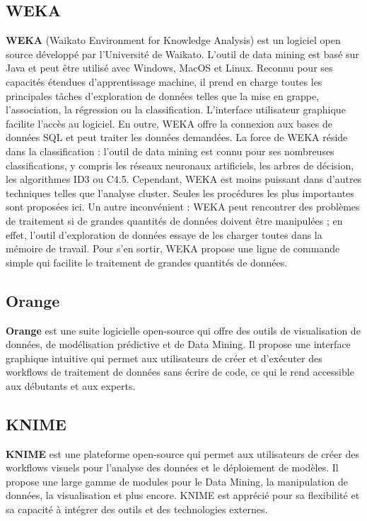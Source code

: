 \documentclass[a4paper,12pt]{report}
\begin{document}
    
    \subsection{WEKA}
    \textbf{WEKA} (Waikato Environment for Knowledge Analysis) est un logiciel open source développé par l'Université de Waikato. L'outil de data mining est basé sur Java et peut être utilisé avec Windows, MacOS et Linux. Reconnu pour ses capacités étendues d'apprentissage machine, il prend en charge toutes les principales tâches d'exploration de données telles que la mise en grappe, l'association, la régression ou la classification. L'interface utilisateur graphique facilite l'accès au logiciel. En outre, WEKA offre la connexion aux bases de données SQL et peut traiter les données demandées. La force de WEKA réside dans la classification : l'outil de data mining est connu pour ses nombreuses classifications, y compris les réseaux neuronaux artificiels, les arbres de décision, les algorithmes ID3 ou C4.5. Cependant, WEKA est moins puissant dans d'autres techniques telles que l'analyse cluster. Seules les procédures les plus importantes sont proposées ici. Un autre inconvénient : WEKA peut rencontrer des problèmes de traitement si de grandes quantités de données doivent être manipulées ; en effet, l'outil d'exploration de données essaye de les charger toutes dans la mémoire de travail. Pour s'en sortir, WEKA propose une ligne de commande simple qui facilite le traitement de grandes quantités de données. 

    
    \subsection{Orange}
    \textbf{Orange} est une suite logicielle open-source qui offre des outils de visualisation de données, de modélisation prédictive et de Data Mining. Il propose une interface graphique intuitive qui permet aux utilisateurs de créer et d’exécuter des workflows de traitement de données sans écrire de code, ce qui le rend accessible aux débutants et aux experts.

    
    \subsection{KNIME}
    \textbf{KNIME} est une plateforme open-source qui permet aux utilisateurs de créer des workflows visuels pour l’analyse des données et le déploiement de modèles. Il propose une large gamme de modules pour le Data Mining, la manipulation de données, la visualisation et plus encore. KNIME est apprécié pour sa flexibilité et sa capacité à intégrer des outils et des technologies externes.
    
\end{document}
